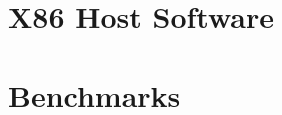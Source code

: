 \documentclass[12pt]{article}
\begin{document}






\section{X86 Host Software}\label{sec:sw}


\section{Benchmarks}\label{sec:bench}
\end{document}
